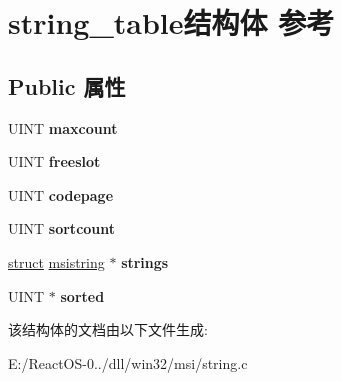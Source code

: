 \hypertarget{structstring__table}{}\section{string\+\_\+table结构体 参考}
\label{structstring__table}
\subsection*{Public 属性}
\begin{DoxyCompactItemize}
\item 
\mbox{\label{structstring__table_af5768c99c4f2937c77b465f26e7f3107}} 
U\+I\+NT {\bfseries maxcount}
\item 
\mbox{\label{structstring__table_a3db34f09c334f53a3a4839ed287a900a}} 
U\+I\+NT {\bfseries freeslot}
\item 
\mbox{\label{structstring__table_a01c36965ee6bedb3120e8cc2288f513a}} 
U\+I\+NT {\bfseries codepage}
\item 
\mbox{\label{structstring__table_ac57ef8112b3a21b1c07f2681dc673c94}} 
U\+I\+NT {\bfseries sortcount}
\item 
\mbox{\label{structstring__table_a5aa4aa8504daf7736f6545423cda46e3}} 
\hyperlink{interfacestruct}{struct} \hyperlink{structmsistring}{msistring} $\ast$ {\bfseries strings}
\item 
\mbox{\label{structstring__table_a3b70ff0d68cbbd3b573daf8f9be71df3}} 
U\+I\+NT $\ast$ {\bfseries sorted}
\end{DoxyCompactItemize}


该结构体的文档由以下文件生成\+:\begin{DoxyCompactItemize}
\item 
E\+:/\+React\+O\+S-\/0../dll/win32/msi/string.\+c\end{DoxyCompactItemize}
